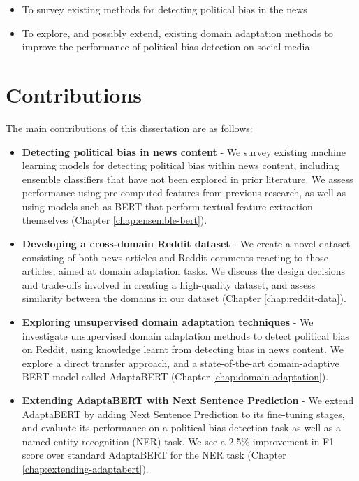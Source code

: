 \begin{itemize}
    \item To survey existing methods for detecting political bias in the news
    \item To explore, and possibly extend, existing domain adaptation methods to improve the performance of political bias detection on social media
\end{itemize}

\section{Contributions}

The main contributions of this dissertation are as follows:

\begin{itemize}
    \item \textbf{Detecting political bias in news content} - We survey existing machine learning models for detecting political bias within news content, including ensemble classifiers that have not been explored in prior literature. We assess performance using pre-computed features from previous research, as well as using models such as BERT that perform textual feature extraction themselves (Chapter \ref{chap:ensemble-bert}).
    \item \textbf{Developing a cross-domain Reddit dataset} - We create a novel dataset consisting of both news articles and Reddit comments reacting to those articles, aimed at domain adaptation tasks. We discuss the design decisions and trade-offs involved in creating a high-quality dataset, and assess similarity between the domains in our dataset (Chapter \ref{chap:reddit-data}).
    \item \textbf{Exploring unsupervised domain adaptation techniques} - We investigate unsupervised domain adaptation methods to detect political bias on Reddit, using knowledge learnt from detecting bias in news content. We explore a direct transfer approach, and a state-of-the-art domain-adaptive BERT model called AdaptaBERT (Chapter \ref{chap:domain-adaptation}).
    \item \textbf{Extending AdaptaBERT with Next Sentence Prediction} - We extend AdaptaBERT by adding Next Sentence Prediction to its fine-tuning stages, and evaluate its performance on a political bias detection task as well as a named entity recognition (NER) task. We see a 2.5\% improvement in F1 score over standard AdaptaBERT for the NER task (Chapter \ref{chap:extending-adaptabert}).
\end{itemize}

